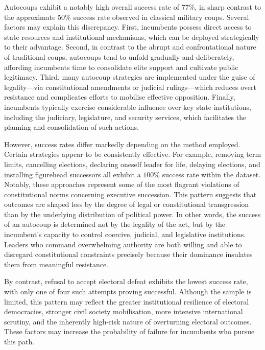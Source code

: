 \documentclass[
  12pt,
]{report}
\begin{document}
Autocoups exhibit a notably high overall success rate of \(77\%\), in
sharp contrast to the approximate \(50\%\) success rate observed in
classical military coups. Several factors may explain this discrepancy.
First, incumbents possess direct access to state resources and
institutional mechanisms, which can be deployed strategically to their
advantage. Second, in contrast to the abrupt and confrontational nature
of traditional coups, autocoups tend to unfold gradually and
deliberately, affording incumbents time to consolidate elite support and
cultivate public legitimacy. Third, many autocoup strategies are
implemented under the guise of legality---via constitutional amendments
or judicial rulings---which reduces overt resistance and complicates
efforts to mobilise effective opposition. Finally, incumbents typically
exercise considerable influence over key state institutions, including
the judiciary, legislature, and security services, which facilitates the
planning and consolidation of such actions.

However, success rates differ markedly depending on the method employed.
Certain strategies appear to be consistently effective. For example,
removing term limits, cancelling elections, declaring oneself leader for
life, delaying elections, and installing figurehead successors all
exhibit a \(100\%\) success rate within the dataset. Notably, these
approaches represent some of the most flagrant violations of
constitutional norms concerning executive succession. This pattern
suggests that outcomes are shaped less by the degree of legal or
constitutional transgression than by the underlying distribution of
political power. In other words, the success of an autocoup is
determined not by the legality of the act, but by the incumbent's
capacity to control coercive, judicial, and legislative institutions.
Leaders who command overwhelming authority are both willing and able to
disregard constitutional constraints precisely because their dominance
insulates them from meaningful resistance.

By contrast, refusal to accept electoral defeat exhibits the lowest
success rate, with only one of four such attempts proving successful.
Although the sample is limited, this pattern may reflect the greater
institutional resilience of electoral democracies, stronger civil
society mobilisation, more intensive international scrutiny, and the
inherently high-risk nature of overturning electoral outcomes. These
factors may increase the probability of failure for incumbents who
pursue this path.
\end{document}

